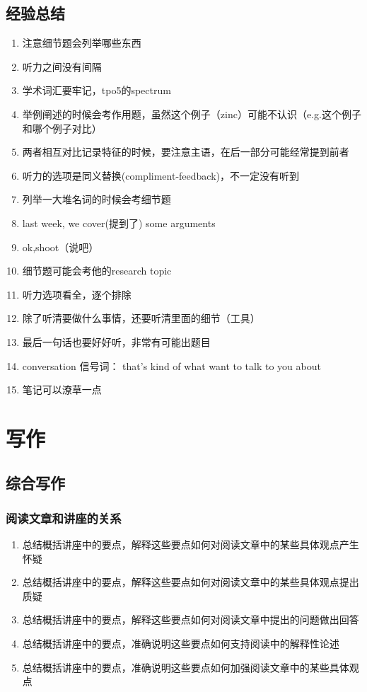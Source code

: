 \documentclass[UTF8]{ctexart}
\begin{document}
\subsection{经验总结}
\begin{enumerate}
  \item 注意细节题会列举哪些东西
  \item 听力之间没有间隔
  \item 学术词汇要牢记，tpo5的spectrum
  \item 举例阐述的时候会考作用题，虽然这个例子（zinc）可能不认识（e.g.这个例子和哪个例子对比）
  \item 两者相互对比记录特征的时候，要注意主语，在后一部分可能经常提到前者
  \item 听力的选项是同义替换(compliment-feedback)，不一定没有听到
  \item 列举一大堆名词的时候会考细节题
  \item last week, we cover(提到了) some arguments
  \item ok,shoot（说吧）
  \item 细节题可能会考他的research topic
  \item 听力选项看全，逐个排除
  \item 除了听清要做什么事情，还要听清里面的细节（工具）
  \item 最后一句话也要好好听，非常有可能出题目
  \item conversation 信号词： that's kind of what want to talk to you about
  \item 笔记可以潦草一点
\end{enumerate}
\section{写作}
\subsection{综合写作}
\subsubsection{阅读文章和讲座的关系}
\begin{enumerate}
  \item 总结概括讲座中的要点，解释这些要点如何对阅读文章中的某些具体观点产生怀疑
  \item 总结概括讲座中的要点，解释这些要点如何对阅读文章中的某些具体观点提出质疑
  \item 总结概括讲座中的要点，解释这些要点如何对阅读文章中提出的问题做出回答
  \item 总结概括讲座中的要点，准确说明这些要点如何支持阅读中的解释性论述
  \item 总结概括讲座中的要点，准确说明这些要点如何加强阅读文章中的某些具体观点
\end{enumerate}
\end{document}
